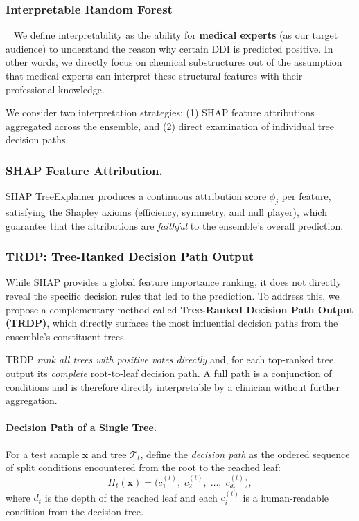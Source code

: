 \documentclass[letterpaper]{article} %
\begin{document}
\subsubsection{Interpretable Random Forest}
\
\newline
We define interpretability as the ability for \textbf{medical experts} (as our target audience) to understand the reason why certain DDI is predicted positive. In other words, we directly focus on chemical substructures out of the assumption that medical experts can interpret these structural features with their professional knowledge.

We consider two interpretation strategies: (1) SHAP feature attributions aggregated across the ensemble, and (2) direct examination of individual tree decision paths.

\subsubsection{SHAP Feature Attribution.}
SHAP TreeExplainer \cite{Lundberg2020} produces a continuous attribution score $\phi_j$ per feature, satisfying the Shapley axioms (efficiency, symmetry, and null player), which guarantee that the attributions are \emph{faithful} to the ensemble's overall prediction.

\subsubsection{TRDP: Tree-Ranked Decision Path Output}
While SHAP provides a global feature importance ranking, it does not directly reveal the specific decision rules that led to the prediction. To address this, we propose a complementary method called \textbf{Tree-Ranked Decision Path Output (TRDP)}, which directly surfaces the most influential decision paths from the ensemble's constituent trees.

TRDP \emph{rank all trees with positive votes directly} and, for each top-ranked tree, output its \emph{complete} root-to-leaf decision path.  A full path is a conjunction of conditions and is therefore directly interpretable by a clinician without further aggregation.
 
\paragraph{Decision Path of a Single Tree.}
For a test sample $\mathbf{x}$ and tree $\mathcal{T}_t$, define the
\emph{decision path} as the ordered sequence of split conditions
encountered from the root to the reached leaf:
\begin{equation}
    \Pi_t(\mathbf{x}) =
    \bigl(c_1^{(t)},\; c_2^{(t)},\; \ldots,\; c_{d_t}^{(t)}\bigr),
    \label{eq:path}
\end{equation}
where $d_t$ is the depth of the reached leaf and each $c_i^{(t)}$ is a human-readable condition from the decision tree.
\end{document}

